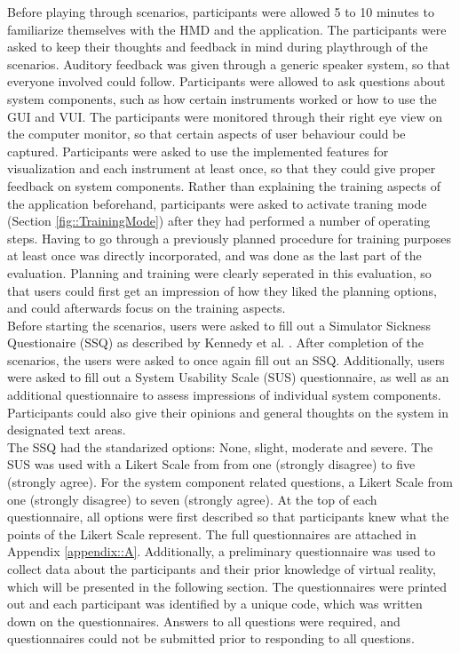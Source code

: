 Before playing through scenarios, participants were allowed 5 to 10 minutes to familiarize themselves with the HMD and the application.
The participants were asked to keep their thoughts and feedback in mind during playthrough of the scenarios.
Auditory feedback was given through a generic speaker system, so that everyone involved could follow.
Participants were allowed to ask questions about system components, such as how certain instruments worked or how to use the GUI and VUI.
The participants were monitored through their right eye view on the computer monitor, so that certain aspects of user behaviour could be captured.
Participants were asked to use the implemented features for visualization and each instrument at least once, so that they could give proper feedback on system components.
Rather than explaining the training aspects of the application beforehand, participants were asked to activate traning mode (Section \ref{fig::TrainingMode}) after they had performed a number 
of operating steps.
Having to go through a previously planned procedure for training purposes at least once was directly incorporated, and was done as the last part of the evaluation.
Planning and training were clearly seperated in this evaluation, so that users could first get an impression of how they liked the planning options, and could afterwards focus on the training aspects.
\\ Before starting the scenarios, users were asked to fill out a Simulator Sickness Questionaire (SSQ) as described by Kennedy et al. \cite{kennedy1993simulator}.
After completion of the scenarios, the users were asked to once again fill out an SSQ.
Additionally, users were asked to fill out a System Usability Scale (SUS) \cite{brooke1996sus} questionnaire, as well as an additional questionnaire to assess impressions of individual system components.
Participants could also give their opinions and general thoughts on the system in designated text areas.
\\ The SSQ had the standarized options: None, slight, moderate and severe.
The SUS was used with a Likert Scale from from one (strongly disagree) to five (strongly agree).
For the system component related questions, a Likert Scale from one (strongly disagree) to seven (strongly agree).
At the top of each questionnaire, all options were first described so that participants knew what the points of the Likert Scale represent.
The full questionnaires are attached in Appendix \ref{appendix::A}.
Additionally, a preliminary questionnaire was used to collect data about the participants and their prior knowledge of virtual reality, which will be presented in the following section.
The questionnaires were printed out and each participant was identified by a unique code, which was written down on the questionnaires.
Answers to all questions were required, and questionnaires could not be submitted prior to responding to all questions.
